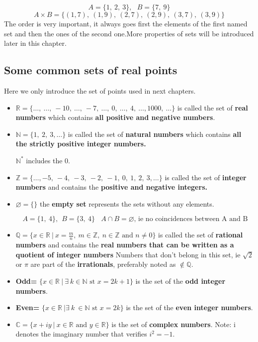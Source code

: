 \documentclass[12pt, a4paper]{book}
\begin{document}
\begin{exmp}
  \[
    A=\{1, \ 2, \ 3 \}, \ \ \ B=\{7, \ 9 \}
  \]
  \[
    A \times B= \{ (1,7), \ (1,9), \ (2,7), \ (2,9), \ (3,7), \ (3,9) \}
  \]
  The order is very important, it always goes first the elements of the first named set and then the ones of the second one.More properties of sets will be introduced later in this chapter.
\end{exmp}

\subsection*{Some common sets of real points}
Here we only introduce the set of points used in next chapters.

\begin{defn}
\end{defn}
\boldmath
  \begin{itemize}
    \item $\mathbb{R}=\{ \ldots, \ \ldots, \ -10, \ \ldots, \ -7, \ \ldots, \ 0, \ \ldots, \ 4, \ \ldots, 1000, \ \ldots  \}$ is called the set of \textbf{real numbers} which contains \textbf{all positive and negative numbers}.
    \item $\mathbb{N}= \{1, \ 2 , \ 3 , \ldots \}$ is called the set of \textbf{natural numbers} which contains \textbf{all the strictly positive integer numbers.}
    \begin{rem}
      $\mathbb{N^{*}}$ includes the 0.
    \end{rem}
    \item $\mathbb{Z}= \{\ldots, -5, \ -4, \ -3, \ -2, \ -1, \ 0, \ 1, \ 2, \ 3, \ldots  \}$ is called the set of \textbf{integer numbers} and contains the \textbf{positive and negative integers.}
    \item $\varnothing = \{\}$ the \textbf{empty set} represents the sets without any elements. 
    \begin{exmp}
      \[
        A=\{1, \ 4 \}, \ \ B=\{3, \ 4 \} \ \ \ \ A \cap B= \varnothing \text{, ie no coincidences between A and B}
      \]
    \end{exmp} 
    \item $\mathbb{Q}= \{x \in \mathbb{R} \ \vert \ x= \frac{m}{n}, \ m \in \mathbb{Z}, \ n \in \mathbb{Z} \text{ and } n \neq 0 \}$ is called the set of \textbf{rational numbers} and contains the \textbf{real numbers that can be written as a quotient of integer numbers}
    Numbers that don't belong in this set, ie $\sqrt{2}$ or $\pi$ are part of the \textbf{irrationals}, preferably noted as $\notin \mathbb{Q}$.
    \item \textbf{Odd=} $\{ x \in \mathbb{R} \ \vert \ \exists \ k \in \mathbb{N} \text{ st } x=2k+1 \}$ is the set of the \textbf{odd integer numbers}.
    \item \textbf{Even=} $\{ x \in \mathbb{R} \ \vert \exists \ k \ \in \mathbb{N} \text{ st } x=2k \}$ is the set of the \textbf{even integer numbers}.
    \item $\mathbb{C}= \{x +iy \ \vert \ x \in \mathbb{R} \text{ and } y \in \mathbb{R}  \}$ is the set of \textbf{complex numbers}. Note: i denotes the imaginary number that verifies $i^2=-1$.
  \end{itemize}
  \unboldmath
\end{document}
